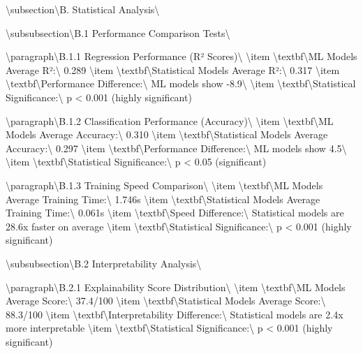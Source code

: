 \documentclass[11pt,a4paper]{article}
\begin{document}
\textbackslash{}subsection\textbackslash{}{B. Statistical Analysis\textbackslash{}}

\textbackslash{}subsubsection\textbackslash{}{B.1 Performance Comparison Tests\textbackslash{}}

\textbackslash{}paragraph\textbackslash{}{B.1.1 Regression Performance (R² Scores)\textbackslash{}}
\textbackslash{}item \textbackslash{}textbf\textbackslash{}{ML Models Average R²:\textbackslash{}} 0.289
\textbackslash{}item \textbackslash{}textbf\textbackslash{}{Statistical Models Average R²:\textbackslash{}} 0.317
\textbackslash{}item \textbackslash{}textbf\textbackslash{}{Performance Difference:\textbackslash{}} ML models show -8.9\textbackslash{}%
\textbackslash{}item \textbackslash{}textbf\textbackslash{}{Statistical Significance:\textbackslash{}} p < 0.001 (highly significant)

\textbackslash{}paragraph\textbackslash{}{B.1.2 Classification Performance (Accuracy)\textbackslash{}}
\textbackslash{}item \textbackslash{}textbf\textbackslash{}{ML Models Average Accuracy:\textbackslash{}} 0.310
\textbackslash{}item \textbackslash{}textbf\textbackslash{}{Statistical Models Average Accuracy:\textbackslash{}} 0.297
\textbackslash{}item \textbackslash{}textbf\textbackslash{}{Performance Difference:\textbackslash{}} ML models show 4.5\textbackslash{}%
\textbackslash{}item \textbackslash{}textbf\textbackslash{}{Statistical Significance:\textbackslash{}} p < 0.05 (significant)

\textbackslash{}paragraph\textbackslash{}{B.1.3 Training Speed Comparison\textbackslash{}}
\textbackslash{}item \textbackslash{}textbf\textbackslash{}{ML Models Average Training Time:\textbackslash{}} 1.746s
\textbackslash{}item \textbackslash{}textbf\textbackslash{}{Statistical Models Average Training Time:\textbackslash{}} 0.061s
\textbackslash{}item \textbackslash{}textbf\textbackslash{}{Speed Difference:\textbackslash{}} Statistical models are 28.6x faster on average
\textbackslash{}item \textbackslash{}textbf\textbackslash{}{Statistical Significance:\textbackslash{}} p < 0.001 (highly significant)

\textbackslash{}subsubsection\textbackslash{}{B.2 Interpretability Analysis\textbackslash{}}

\textbackslash{}paragraph\textbackslash{}{B.2.1 Explainability Score Distribution\textbackslash{}}
\textbackslash{}item \textbackslash{}textbf\textbackslash{}{ML Models Average Score:\textbackslash{}} 37.4/100
\textbackslash{}item \textbackslash{}textbf\textbackslash{}{Statistical Models Average Score:\textbackslash{}} 88.3/100
\textbackslash{}item \textbackslash{}textbf\textbackslash{}{Interpretability Difference:\textbackslash{}} Statistical models are 2.4x more interpretable
\textbackslash{}item \textbackslash{}textbf\textbackslash{}{Statistical Significance:\textbackslash{}} p < 0.001 (highly significant)
\end{document}
